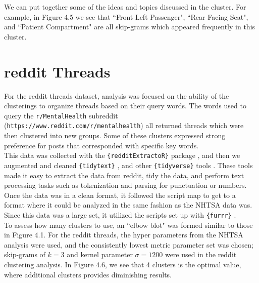 We can put together some of the ideas and topics discussed in the cluster. For example, in Figure 4.5 we see that ``Front Left Passenger", ``Rear Facing Seat", and ``Patient Compartment" are all skip-grams which appeared frequently in this cluster.\\


\section{reddit Threads}

\hspace*{0.3cm} For the reddit threads dataset, analysis was focused on the ability of the clusterings to organize threads based on their query words. The words used to query the \texttt{r/MentalHealth} subreddit (\texttt{https://www.reddit.com/r/mentalhealth}) all returned threads which were then clustered into new groups. Some of these clusters expressed strong preference for posts that corresponded with specific key words. \\

This data was collected with the \texttt{\{redditExtractoR\}} package \cite{rivera2015package}, and then we augmented and cleaned \texttt{\{tidytext\}} \cite{silge2016tidytext}, and other \texttt{\{tidyverse\}} tools \cite{wickham2019welcome}. These tools made it easy to extract the data from reddit, tidy the data, and perform text processing tasks such as tokenization and parsing for punctuation or numbers. Once the data was in a clean format, it followed the script map to get to a format where it could be analyzed in the same fashion as the NHTSA data was. Since this data was a large set, it utilized the scripts set up with \texttt{\{furrr\}} \cite{bengtsson2020unifying}.\\

To assess how many clusters to use, an ``elbow blot" was formed similar to those in Figure 4.1. For the reddit threads, the hyper parameters from the NHTSA analysis were used, and the consistently lowest metric parameter set was chosen; skip-grams of $k=3$ and kernel parameter $\sigma = 1200$ were used in the reddit clustering analysis. In Figure 4.6, we see that 4 clusters is the optimal value, where additional clusters provides diminishing results. \\

